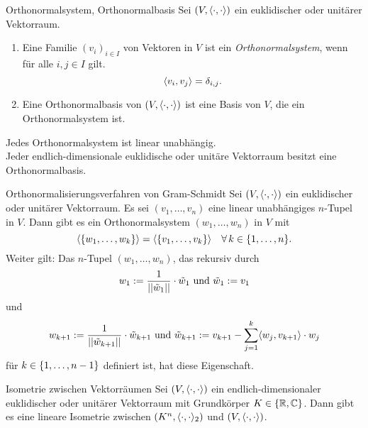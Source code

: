 \documentclass[main.tex]{subfiles}
\begin{document}
\begin{karte}{Orthonormalsystem, Orthonormalbasis}
    Sei \( (V, \langle \cdot, \cdot \rangle) \) ein 
    euklidischer oder unitärer Vektorraum. 
    \begin{enumerate}
        \item Eine Familie \( (v_i)_{i\in I} \) 
        von Vektoren in \(V\) ist ein 
        \textit{Orthonormalsystem}, wenn für alle 
        \( i,j \in I \) gilt.
        \[ \langle v_i, v_j \rangle = \delta_{i,j}. \]
        \item Eine Orthonormalbasis von 
        \( (V, \langle \cdot, \cdot \rangle) \) ist 
        eine Basis von \(V\), die ein Orthonormalsystem ist.
    \end{enumerate}
    Jedes Orthonormalsystem ist linear unabhängig.\\
    Jeder endlich-dimensionale euklidische oder 
    unitäre Vektorraum besitzt eine Orthonormalbasis.
\end{karte}

\begin{karte}{Orthonormalisierungsverfahren von Gram-Schmidt}
   Sei \( (V, \langle \cdot, \cdot \rangle) \) ein 
   euklidischer oder unitärer Vektorraum. Es sei 
   \( (v_1,\ldots, v_n) \) eine linear unabhängiges 
   \(n\)-Tupel in \(V\). Dann gibt es ein 
   Orthonormalsystem \( (w_1, \ldots, w_n) \) in \(V\) 
   mit 
   \[ \langle \set{w_1, \ldots, w_k} \rangle 
   = \langle \set{ v_1, \ldots, v_k } \rangle \quad 
   \forall k \in \set{1,\ldots, n}. \]
   Weiter gilt: Das \(n\)-Tupel 
   \( (w_1, \ldots, w_n) \), das rekursiv durch 
   \[ w_1 := \frac{1}{\left|\left|\tilde{w}_1\right|\right|} \cdot \tilde{w}_1 
   \text{ und } \tilde{w}_1 := v_1 \]
   und 
   \[ w_{k+1} := \frac{1}{\left|\left| \tilde{w}_{k+1} \right|\right|} 
   \cdot \tilde{w}_{k+1} \text{ und } 
   \tilde{w}_{k+1} := 
   v_{k+1} - \sum_{j=1}^k \langle w_j, v_{k+1} \rangle \cdot w_j \]
   für \( k\in \{1, \ldots, n-1\} \) definiert ist, hat 
   diese Eigenschaft.
\end{karte}

\begin{karte}{Isometrie zwischen Vektorräumen}
    Sei \( (V, \langle \cdot, \cdot \rangle) \) ein 
    endlich-dimensionaler euklidischer oder 
    unitärer Vektorraum mit Grundkörper 
    \( K\in \{\mathbb{R}, \mathbb{C}\} \). Dann gibt es eine lineare 
    Isometrie zwischen \( (K^n, \langle \cdot, \cdot \rangle_2) \)
    und \( (V, \langle \cdot, \cdot \rangle) \).
\end{karte}
\end{document}
